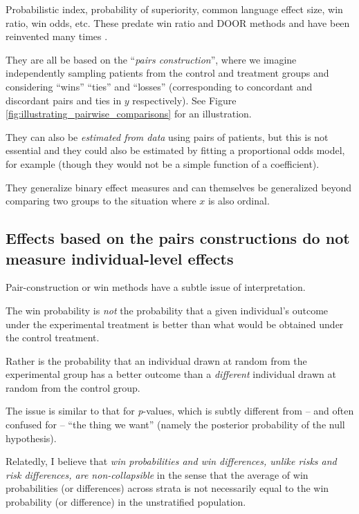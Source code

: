 \documentclass[
  11pt,
  fleqn
]{article}
\begin{document}
Probabilistic index, probability of
superiority, common language effect size, win ratio, win odds, etc.
These predate win ratio and
DOOR methods and have been reinvented many times
\citep[e.g.][p.~14]{agrestiAnalysisOrdinalCategorical2010}.

They are all be based on the ``\emph{pairs construction}'',
where we imagine independently sampling patients from the control and
treatment groups and considering ``wins'' ``ties'' and ``losses''
(corresponding to concordant and discordant pairs and ties in $y$
respectively). See Figure \ref{fig:illustrating_pairwise_comparisons}
for an illustration.

They can
also be \emph{estimated from data} using pairs of patients, but this
is not essential and they could also be estimated by fitting a
proportional odds model, for example (though they would not be a
simple function of a coefficient).

They generalize binary effect measures and can themselves be
generalized beyond comparing two groups to the situation where $x$ is
also ordinal.

\subsection{Effects based on the pairs constructions do not measure
individual-level effects}

Pair-construction or win methods have a subtle issue of interpretation.

The win probability is \emph{not} the probability that a given
individual's outcome under the experimental treatment is better than
what would be obtained under the control treatment.

Rather is the probability that an individual drawn at random
from the experimental group has a better outcome than a \emph{different}
individual drawn at random from the control group.

The issue is similar to that for \emph{p}-values, which is subtly
different from -- and often confused for -- ``the thing we want''
(namely the posterior probability of the null hypothesis).

Relatedly, I believe that \emph{win probabilities and win
differences, unlike risks and risk differences, are non-collapsible}
in the sense that the average of win probabilities (or differences)
across strata is not necessarily equal to the win probability (or
difference) in the unstratified population.
\end{document}
